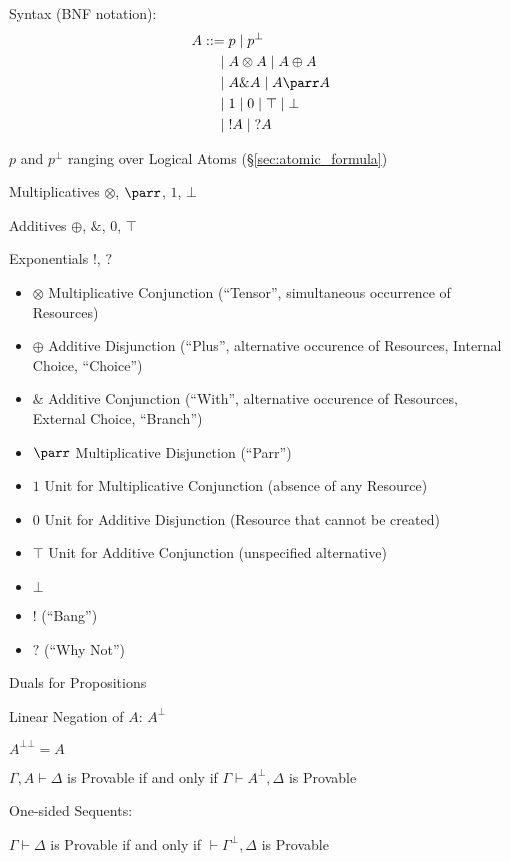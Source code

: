 Syntax (BNF notation):
\[
\begin{split}
  A ::=& \; p \; | \; p^\bot\\
      |& \; A \otimes A \; | \; A \oplus A\\
      |& \; A \& A \; | \; A \parr A\\
      |& \; 1 \; | \; 0 \; | \; \top \; | \; \bot\\
      |& \; !A \; | \; ?A
\end{split}
\]

$p$ and $p^\bot$ ranging over Logical Atoms
(\S\ref{sec:atomic_formula})

Multiplicatives $\otimes$, $\parr$, $1$, $\bot$

Additives $\oplus$, $\&$, $0$, $\top$

Exponentials $!$, $?$

\begin{itemize}
  \item $\otimes$ Multiplicative Conjunction (``Tensor'', simultaneous
    occurrence of Resources)
  \item $\oplus$ Additive Disjunction (``Plus'', alternative occurence
    of Resources, Internal Choice, ``Choice'')
  \item $\&$ Additive Conjunction (``With'', alternative occurence of
    Resources, External Choice, ``Branch'')
  \item $\parr$ Multiplicative Disjunction (``Parr'')
  \item $1$ Unit for Multiplicative Conjunction (absence of any
    Resource)
  \item $0$ Unit for Additive Disjunction (Resource that cannot be
    created)
  \item $\top$ Unit for Additive Conjunction (unspecified alternative)
  \item $\bot$
  \item $!$ (``Bang'')
  \item $?$ (``Why Not'')
\end{itemize}

Duals for Propositions %

Linear Negation of $A$: $A^\bot$

$A^{\bot\bot} = A$

\cite{llwiki16}
$\Gamma, A \vdash \Delta$ is Provable if and only if $\Gamma \vdash
A^\bot, \Delta$ is Provable

One-sided Sequents:

$\Gamma \vdash \Delta$ is Provable if and only if $\vdash \Gamma^\bot,
\Delta$ is Provable


